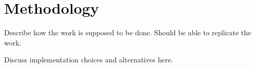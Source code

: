 \chapter{Methodology}\label{cha:method}

Describe how the work is supposed to be done. Should be able to replicate the work.

Discuss implementation choices and alternatives here.

